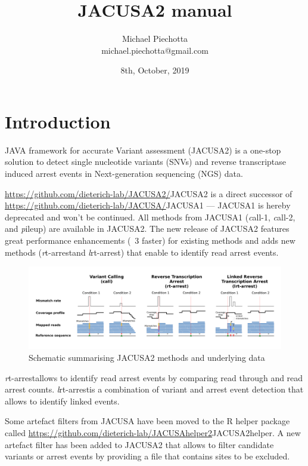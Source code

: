 \documentclass[10pt,a4paper]{article}
\title{JACUSA2 manual}
\author{Michael Piechotta \\ michael.piechotta@gmail.com}
\date{8th, October, 2019}
\begin{document}
\newcommand{\call}[1]{{\textit call-#1}}
\newcommand{\pileup}{{\textit pileup}}
\newcommand{\rtarrest}{{\textit rt-arrest}}
\newcommand{\lrtarrest}{{\textit lrt-arrest}}
\maketitle 
\tableofcontents
\listoftodos
\section{Introduction}
JAVA framework for accurate Variant assessment (JACUSA2) is a one-stop solution to detect single
nucleotide variants (SNVs) and reverse transcriptase induced arrest events in Next-generation 
sequencing (NGS) data.

\url{https://github.com/dieterich-lab/JACUSA2/}{JACUSA2} is a direct successor of 
\url{https://github.com/dieterich-lab/JACUSA/}{JACUSA1} --- JACUSA1 is hereby deprecated and won't be 
continued. All methods from JACUSA1 (\call{1}, \call{2}, and \pileup) are available in JACUSA2.
The new release of JACUSA2 features great performance enhancements (~3 faster) for existing methods 
and adds new methods (\rtarrest and \lrtarrest) that enable to identify read arrest events.
\begin{figure}[ht]
	\centering
	\includegraphics[width=\textwidth]{figures/poster_jacusa_methods}
	\caption{Schematic summarising JACUSA2 methods and underlying data}
	\label{fig:methods}
\end{figure}
\rtarrest allows to identify read arrest events by comparing read through and read arrest counts. 
\lrtarrest is a combination of variant and arrest event detection that allows to identify linked events.

Some artefact filters from JACUSA have been moved to the R helper package called 
\url{https://github.com/dieterich-lab/JACUSAhelper2}{JACUSA2helper}.
A new artefact filter has been added to JACUSA2 that allows to filter candidate variants or arrest events 
by providing a file that contains sites to be excluded.
\end{document}
